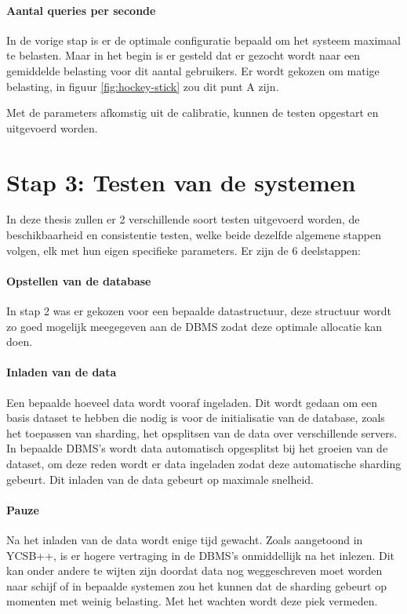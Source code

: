 \paragraph{Aantal queries per seconde} In de vorige stap is er de optimale configuratie bepaald om het systeem maximaal te belasten. Maar in het begin is er gesteld dat er gezocht wordt naar een gemiddelde belasting voor dit aantal gebruikers. Er wordt gekozen om matige belasting, in figuur \ref{fig:hockey-stick} zou dit punt A zijn. 

Met de parameters afkomstig uit de calibratie, kunnen de testen opgestart en uitgevoerd worden. 

\section{Stap 3: Testen van de systemen} \label{sec:testenvandesystemen}
In deze thesis zullen er 2 verschillende soort testen uitgevoerd worden, de beschikbaarheid en consistentie testen, welke beide dezelfde algemene stappen volgen, elk met hun eigen specifieke parameters. Er zijn de 6 deelstappen: 

\paragraph{Opstellen van de database} In stap 2 was er gekozen voor een bepaalde datastructuur, deze structuur wordt zo goed mogelijk meegegeven aan de DBMS zodat deze optimale allocatie kan doen.

\paragraph{Inladen van de data} Een bepaalde hoeveel data wordt vooraf ingeladen. Dit wordt gedaan om een basis dataset te hebben die nodig is voor de initialisatie van de database, zoals het toepassen van sharding, het opsplitsen van de data over verschillende servers. In bepaalde DBMS's wordt data automatisch opgesplitst bij het groeien van de dataset, om deze reden wordt er data ingeladen zodat deze automatische sharding gebeurt. Dit inladen van de data gebeurt op maximale snelheid. 

\paragraph{Pauze} Na het inladen van de data wordt enige tijd gewacht. Zoals aangetoond in YCSB++\cite[Figuur 9]{patil2011ycsb++}, is er hogere vertraging in de DBMS's onmiddellijk na het inlezen. Dit kan onder andere te wijten zijn doordat data nog weggeschreven moet worden naar schijf of in bepaalde systemen zou het kunnen dat de sharding gebeurt op momenten met weinig belasting. Met het wachten wordt deze piek vermeden. 

